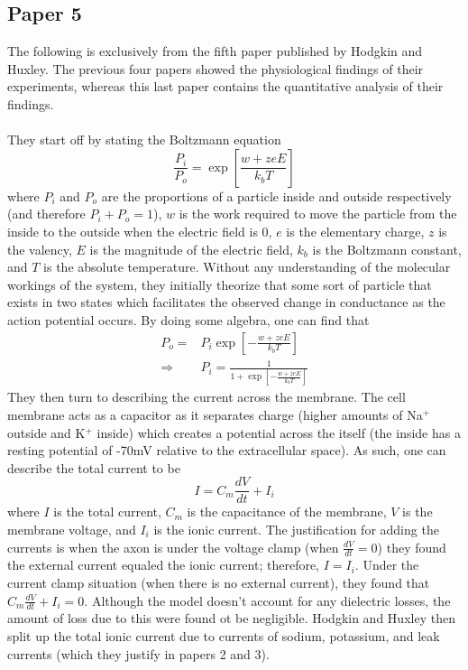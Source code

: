 \documentclass{article}
\newcommand{\od}[2]{\frac{d #1}{d #2}}
\numberwithin{equation}{section}
\begin{document}
\subsection{Paper 5}
The following is exclusively from the fifth paper published by Hodgkin and Huxley. The previous four papers showed the physiological findings of their experiments, whereas this last paper contains the quantitative analysis of their findings. \\\\
They start off by stating the Boltzmann equation 
\begin{equation}
    \frac{P_i}{P_o} = \exp\left[ \frac{w+z e E}{k_bT}\right]
\end{equation}
where $P_i$ and $P_o$ are the proportions of a particle inside and outside respectively (and therefore $P_i+P_o =1$), $w$ is the work required to move the particle from the inside to the outside when the electric field is 0, $e$ is the elementary charge, $z$ is the valency, $E$ is the magnitude of the electric field, $k_b$ is the Boltzmann constant, and $T$ is the absolute temperature. Without any understanding of the molecular workings of the system, they initially theorize that some sort of particle that exists in two states which facilitates the observed change in conductance as the action potential occurs. By doing some algebra, one can find that 
\begin{equation*} 
\begin{split}
    P_o = &P_i \exp\left[- \frac{w+z e E}{k_bT}\right]\\
    \Rightarrow &P_i = \frac{1}{1+\exp\left[ -\frac{w+z e E}{k_bT}\right]}
\end{split}
\end{equation*}
They then turn to describing the current across the membrane. The cell membrane acts as a capacitor as it separates charge (higher amounts of Na$^+$ outside and K$^+$ inside) which creates a potential across the itself (the inside has a resting potential of -70mV relative to the extracellular space). As such, one can describe the total current to be 
\begin{equation}
    I=C_m \od{V}{t} + I_i
\end{equation}
where $I$ is the total current, $C_m$ is the capacitance of the membrane, $V$ is the membrane voltage, and $I_i$ is the ionic current. The justification for adding the currents is when the axon is under the voltage clamp (when $\od{V}{t} = 0$) they found the external current equaled the ionic current; therefore, $I=I_i$. Under the current clamp situation (when there is no external current), they found that $C_m \od{V}{t} + I_i=0$. Although the model doesn't account for any dielectric losses, the amount of loss due to this were found ot be negligible. Hodgkin and Huxley then split up the total ionic current due to currents of sodium, potassium, and leak currents (which they justify in papers 2 and 3).
\end{document}
